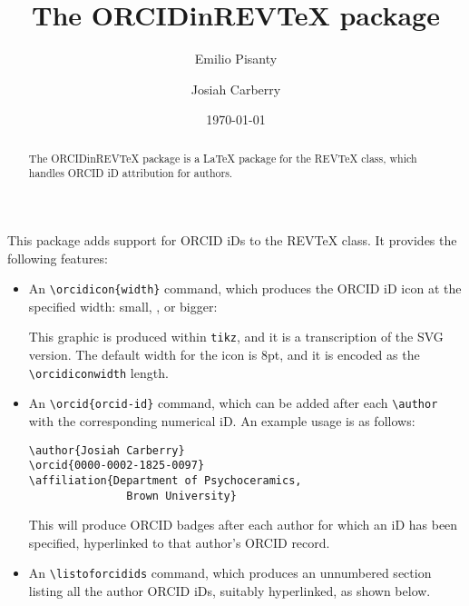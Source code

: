 \documentclass[%
  reprint,
  aps,
  pra,
  superscriptaddress,
  a4paper,
]{revtex4-2}
\begin{document}
\title{The ORCIDinREVTeX package}

\author{Emilio Pisanty}

\author{Josiah Carberry}

\date{\today}

\begin{abstract}
The ORCIDinREVTeX package is a {\LaTeX} package for the REVTeX class, which handles ORCID iD attribution for authors.
\end{abstract}

\maketitle


This package adds support for ORCID iDs to the REVTeX class. It provides the following features:

\begin{itemize}
\item
An \verb|\orcidicon{width}| command, which produces the ORCID iD icon at the specified width: small, \orcidicon{8pt}, or bigger:

\orcidicon{50pt}

This graphic is produced within \texttt{tikz}, and it is a transcription of the SVG version.
The default width for the icon is 8pt, and it is encoded as the \verb|\orcidiconwidth| length.

\item
An \verb|\orcid{orcid-id}| command, which can be added after each \verb|\author| with the corresponding numerical iD. 
An example usage is as follows:
\begin{verbatim}
\author{Josiah Carberry}
\orcid{0000-0002-1825-0097}
\affiliation{Department of Psychoceramics, 
               Brown University}
\end{verbatim}
This will produce ORCID badges after each author for which an iD has been specified, hyperlinked to that author's ORCID record.


\item
An \verb|\listoforcidids| command, which produces an unnumbered section listing all the author ORCID iDs, suitably hyperlinked, as shown below.

\end{itemize}
\end{document}
